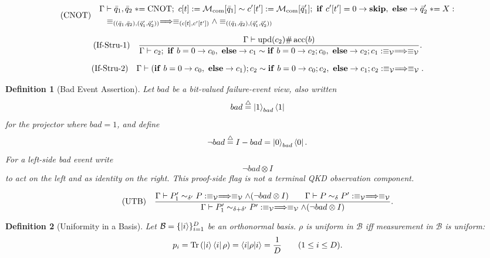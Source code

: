 \documentclass[acmsmall,screen,review,anonymous,nonacm]{acmart}
\newtheorem{definition}{Definition}[section]
\theoremstyle{defn_style}
\newcommand{\asteq}{\mathrel{*}=}
\begin{document}
\[
\text{\rm (CNOT)}
\quad
{\begin{aligned}
\Gamma
&\vdash
\bar q_1,\bar q_2\asteq \mathrm{CNOT};
\ c[t]:=\mathcal M_{\mathrm{com}}[\bar q_1]
\sim
c'[t']:=\mathcal M_{\mathrm{com}}[\bar q'_1];
\ \mathbf{if}\ c'[t']=0\rightarrow\mathbf{skip},
\ \mathbf{else}\rightarrow \bar q'_2\asteq X :\\ 
&
\equiv_{((\bar q_1,\bar q_2),(\bar q'_1,\bar q'_2))}
\Longrightarrow
\equiv_{(c[t],c'[t'])}
\land
\equiv_{((\bar q_1,\bar q_2),(\bar q'_1,\bar q'_2))}
\end{aligned}}
\]

\[
\text{\rm (If-Stru-1)}
\quad
\frac{
\Gamma\vdash
\operatorname{upd}(c_2)
\#
\operatorname{acc}(b)
}{
\Gamma
\vdash
c_2;\
\mathbf{if}\ b=0\rightarrow c_0,\ \mathbf{else}\rightarrow c_1
\sim
\mathbf{if}\ b=0\rightarrow c_2;c_0,\ \mathbf{else}\rightarrow c_2;c_1
:
\equiv_{\mathcal V}
\Longrightarrow
\equiv_{\mathcal V}
}.
\]

\[
\text{\rm (If-Stru-2)}
\quad
\Gamma
\vdash
(\mathbf{if}\ b=0\rightarrow c_0,\ \mathbf{else}\rightarrow c_1);c_2
\sim
\mathbf{if}\ b=0\rightarrow c_0;c_2,\ \mathbf{else}\rightarrow c_1;c_2
:
\equiv_{\mathcal V}
\Longrightarrow
\equiv_{\mathcal V}.
\]

\begin{definition}[Bad Event Assertion]
Let \(bad\) be a bit-valued failure-event view, also written
\[
bad
\stackrel{\triangle}{=}
\ket 1_{bad}\bra 1
\]
for the projector where \(bad=1\), and define
\[
\neg bad
\stackrel{\triangle}{=}
I-bad
=
\ket 0_{bad}\bra 0.
\]
For a left-side bad event write
\[
\neg bad\otimes I
\]
to act on the left and as identity on the right. This proof-side flag is not a
terminal QKD observation component.
\end{definition}

\[
\text{\rm (UTB)}
\quad
\frac{
\Gamma
\vdash
P'_1\sim_{\delta'}P:
\equiv_{\mathcal V}
\Longrightarrow
\equiv_{\mathcal V}\land(\neg bad\otimes I)
\qquad
\Gamma
\vdash
P\sim_{\delta}P':
\equiv_{\mathcal V}
\Longrightarrow
\equiv_{\mathcal V}
}{
\Gamma
\vdash
P'_1\sim_{\delta+\delta'}P':
\equiv_{\mathcal V}
\Longrightarrow
\equiv_{\mathcal V}\land(\neg bad\otimes I)
}.
\]

\begin{definition}[Uniformity in a Basis]
Let
\(\mathcal B=\{\ket{i}\}_{i=1}^{D}\)
be an orthonormal basis. \(\rho\) is uniform in \(\mathcal B\) iff measurement
in \(\mathcal B\) is uniform:
\[
p_i=\operatorname{Tr}\left(\ket{i}\bra{i}\rho\right)
=\langle i|\rho|i\rangle
=\frac{1}{D}\qquad
(1\le i\le D).
\]
\end{definition}
\end{document}
